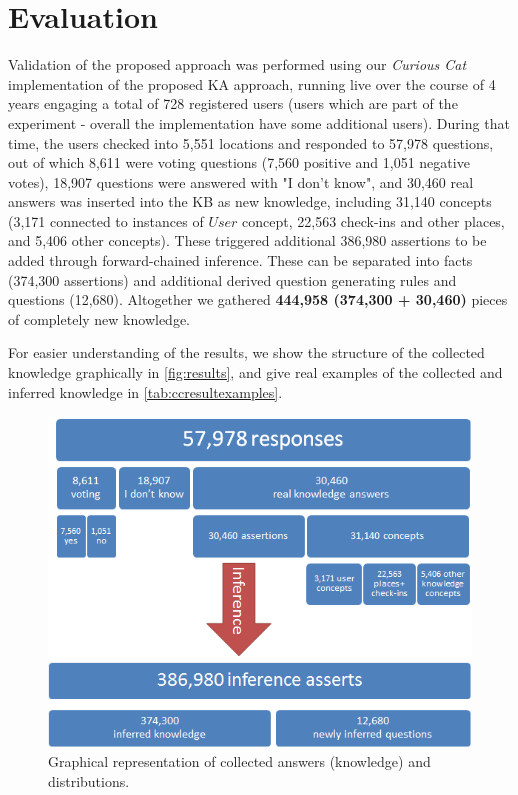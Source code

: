 % 
\chapter{Evaluation}
\label{chapter:evaluation}

Validation of the proposed approach was performed using our \emph{Curious Cat}
implementation of the proposed KA approach, running live over the course of 4 
years engaging a total of 728 registered 
users (users which are part of the experiment - overall the implementation have
some additional users). During that time, the users checked into 5,551 locations
and responded 
to 57,978 questions, out of which 8,611 were voting questions (7,560 positive 
and 1,051 negative votes), 18,907 questions were answered with "I don't know", 
and 30,460 real answers was inserted into the KB as new knowledge, including 
31,140 concepts (3,171 connected to instances of $User$ concept, 22,563 
check-ins and other places, and 5,406 other concepts). 
These triggered additional 386,980 assertions to be added through 
forward-chained inference. These can be separated into facts (374,300 
assertions) and additional derived question generating rules and questions 
(12,680). Altogether we gathered \textbf{444,958 (374,300 + 30,460)} pieces of 
completely new knowledge. 

For easier understanding of the results, we show the structure of the collected
knowledge 
graphically in \autoref{fig:results}, and give real examples of the collected 
and inferred knowledge in \autoref{tab:ccresultexamples}.

\begin{figure}[h]
	\centering
		\includegraphics[width=1\textwidth]{figures/results.png}
	\caption{Graphical representation of collected answers (knowledge) and 
    distributions.}
	\label{fig:results}
\end{figure}

